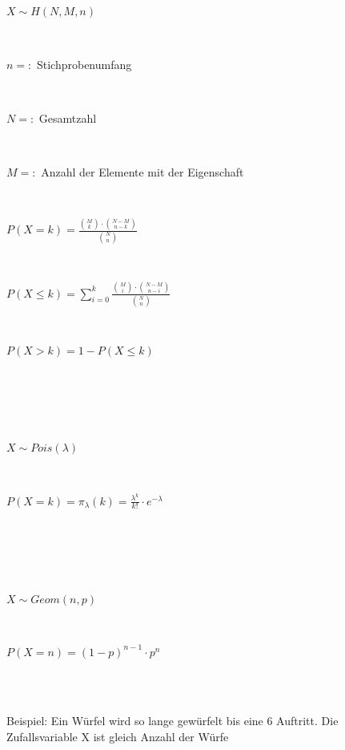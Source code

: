 \documentclass[10pt,a4paper,landscape]{article}
\begin{document}
\begin{multicols*}{4}
\parbox{\columnwidth}{\centering $X \sim H(N, M, n)$}\\
\parbox{\columnwidth}{\centering $n =:$ Stichprobenumfang}\\
\parbox{\columnwidth}{\centering $N =:$ Gesamtzahl}\\
\parbox{\columnwidth}{\centering $M =:$ Anzahl der Elemente mit der Eigenschaft}\\
\parbox{\columnwidth}{\centering $P(X = k) = \frac{\binom{M}{k} \cdot \binom{N-M}{n-k}}{\binom{N}{n}} $}\\
\parbox{\columnwidth}{\centering $P(X \leq k) = \sum \limits_{i=0}^k \frac{\binom{M}{i} \cdot \binom{N-M}{n-i}}{\binom{N}{n}} $}\\
\parbox{\columnwidth}{\centering $P(X > k) = 1 - P(X \leq k)$}\\ \\
\\ \\
\parbox{\columnwidth}{\centering $X \sim Pois(\lambda)$}\\
\parbox{\columnwidth}{\centering $P(X = k) = \pi_\lambda(k) = \frac{\lambda^k}{k!} \cdot e^{-\lambda}$}\\ \\
\\ \\
\parbox{\columnwidth}{\centering $X \sim Geom(n, p)$}\\
\parbox{\columnwidth}{\centering $P(X = n) = (1-p)^{n-1} \cdot p^n$}\\ \\
\parbox{\columnwidth}{\centering Beispiel: Ein Würfel wird so lange gewürfelt bis eine 6 Auftritt. Die Zufallsvariable X ist gleich Anzahl der Würfe}\\


\end{multicols*}
\end{document}
